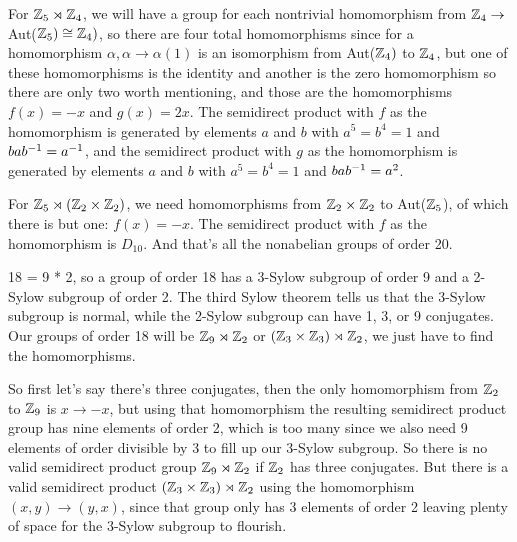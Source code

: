 \documentclass[11pt, oneside]{article}   	%
\begin{document}
For $\mathbb{Z}_5 \rtimes \mathbb{Z}_4$, we will have a group for each nontrivial homomorphism from $\mathbb{Z}_4 \to $ Aut($\mathbb{Z}_5) \cong \mathbb{Z}_4)$, so there are four total homomorphisms since for a homomorphism $\alpha, \alpha \to \alpha(1)$ is an isomorphism from Aut($\mathbb{Z}_4)$ to $\mathbb{Z}_4$, but one of these homomorphisms is the identity and another is the zero homomorphism so there are only two worth mentioning, and those are the homomorphisms $f(x) = -x$ and $g(x) = 2x$. The semidirect product with $f$ as the homomorphism is generated by elements $a$ and $b$ with $a^5 = b^4 = 1$ and $bab^{-1} = a^{-1}$, and the semidirect product with $g$ as the homomorphism is generated by elements $a$ and $b$ with $a^5 = b^4 = 1$ and $bab^{-1} = a^2$. 

For $\mathbb{Z}_5 \rtimes (\mathbb{Z}_2 \times \mathbb{Z}_2)$, we need homomorphisms from $\mathbb{Z}_2 \times \mathbb{Z}_2$ to Aut($\mathbb{Z}_5$), of which there is but one: $f(x) = -x$. The semidirect product with $f$ as the homomorphism is $D_{10}$. And that's all the nonabelian groups of order 20.
\item 18 = 9 * 2, so a group of order 18 has a 3-Sylow subgroup of order 9 and a 2-Sylow subgroup of order 2. The third Sylow theorem tells us that the 3-Sylow subgroup is normal, while the 2-Sylow subgroup can have 1, 3, or 9 conjugates. Our groups of order 18 will be  $\mathbb{Z}_9 \rtimes \mathbb{Z}_2$ or $(\mathbb{Z}_3 \times \mathbb{Z}_3) \rtimes \mathbb{Z}_2$, we just have to find the homomorphisms.

So first let's say there's three conjugates, then the only homomorphism from $\mathbb{Z}_2$ to $\mathbb{Z}_9$ is $x\to -x$, but using that homomorphism the resulting semidirect product group has nine elements of order 2, which is too many since we also need 9 elements of order divisible by 3 to fill up our 3-Sylow subgroup. So there is no valid semidirect product group $\mathbb{Z}_9 \rtimes \mathbb{Z}_2$ if $\mathbb{Z}_2$ has three conjugates. But there is a valid semidirect product $(\mathbb{Z}_3 \times \mathbb{Z}_3) \rtimes \mathbb{Z}_2$ using the homomorphism $(x, y) \to (y, x)$, since that group only has 3 elements of order 2 leaving plenty of space for the 3-Sylow subgroup to flourish.
\end{document}
